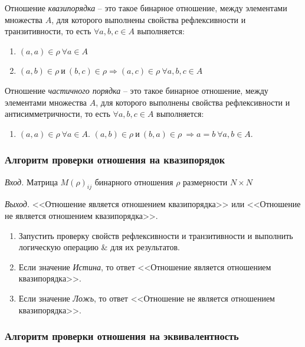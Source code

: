 \documentclass[bachelor, och, labwork]{shiza}
\begin{document}
Отношение \textit{квазипорядка} -- это такое бинарное отношение, между элементами
множества $A$, для которого выполнены свойства рефлексивности и транзитивности,
то есть $\forall a,b,c \in A$ выполняется:
\begin{enumerate}
    \item $(a,a)\in\rho~\forall a \in A$
    \item $(a,b)\in\rho ~\text{и}~ (b,c)\in\rho\Rightarrow (a,c) \in\rho ~\forall a,b,c \in A $
\end{enumerate}

Отношение \textit{частичного порядка} -- это такое бинарное отношение, между
элементами множества $A$, для которого выполнены свойства рефлексивности и
антисимметричности, то есть $\forall a,b,c \in A$ выполняется:
\begin{enumerate}
    \item $(a,a)\in\rho~\forall a \in A$.
    $(a,b) \in\rho~\text{и}~(b,a) \in\rho ~ \Rightarrow a = b ~\forall a,b \in A$.
\end{enumerate}


\subsubsection{Алгоритм проверки отношения на квазипорядок}

\textit{Вход.} Матрица $M(\rho)_{ij}$ бинарного отношения $\rho$ размерности
$N \times N$

\textit{Выход.} <<Отношение является отношением квазипорядка>> или <<Отношение 
не является отношением квазипорядка>>.

\begin{enumerate}

    \item Запустить проверку свойств рефлексивности и транзитивности и выполнить
    логическую операцию \& для их результатов.

    \item Если значение \textit{Истина}, то ответ <<Отношение является отношением
    квазипорядка>>.
    
    \item Если значение \textit{Ложь}, то ответ <<Отношение не является 
    отношением квазипорядка>>.

\end{enumerate}


\subsubsection{Алгоритм проверки отношения на эквивалентность}
\end{document}
